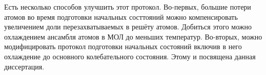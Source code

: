 Есть несколько способов улучшить этот протокол. 
Во-первых, большие потери атомов во время подготовки начальных состтояний можно компенсировать увеличением доли перезахватываемых в решёту атомов.
Добиться этого можно охлаждением ансамбля атомов в МОЛ до меньших температур.
Во-вторых, можно модифицировать протокол подготовки начальных состояний включив в него охлаждение до основного колебательного состояния. 
Этому и посвящена данная диссертация.

%
